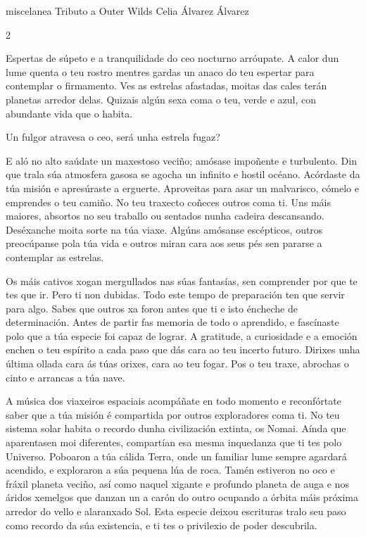 \Artigo%
{miscelanea}%
{Tributo a Outer Wilds}%
{Celia Álvarez Álvarez}%
{}%

\begin{multicols}{2}

Espertas de súpeto e a tranquilidade do ceo nocturno arróupate. A calor dun
lume quenta o teu rostro mentres gardas un anaco do teu espertar para
contemplar o firmamento. Ves as estrelas afastadas, moitas das cales terán
planetas arredor delas. Quizais algún sexa coma o teu, verde e azul, con
abundante vida que o habita.

Un fulgor atravesa o ceo, será unha estrela fugaz?

E aló no alto saúdate un maxestoso veciño; amósase impoñente e turbulento.
Din que trala súa atmosfera gasosa se agocha un infinito e hostil océano.
Acórdaste da túa misión e apresúraste a erguerte. Aproveitas para asar un
malvarisco, cómelo e emprendes o teu camiño. No teu traxecto coñeces outros
coma ti. Uns máis maiores, absortos no seu traballo ou sentados nunha cadeira
descansando. Deséxanche moita sorte na túa viaxe. Algúns amósanse escépticos,
outros preocúpanse pola túa vida e outros miran cara aos seus pés sen pararse
a contemplar as estrelas.

Os máis cativos xogan mergullados nas súas fantasías, sen comprender por que te
tes que ir. Pero ti non dubidas. Todo este tempo de preparación ten que
servir para algo. Sabes que outros xa foron antes que ti e isto éncheche de
determinación. Antes de partir fas memoria de todo o aprendido, e fascínaste
polo que a túa especie foi capaz de lograr. A gratitude, a curiosidade e a
emoción enchen o teu espírito a cada paso que dás cara ao teu incerto futuro.
Dirixes unha última ollada cara ás túas orixes, cara ao teu fogar. Pos o teu
traxe, abrochas o cinto e arrancas a túa nave.

A música dos viaxeiros espaciais acompáñate en todo momento e reconfórtate
saber que a túa misión é compartida por outros exploradores coma ti. No teu
sistema solar habita o recordo dunha civilización extinta, os Nomai. Aínda
que aparentasen moi diferentes, compartían esa mesma inquedanza que ti tes
polo Universo. Poboaron a túa cálida Terra, onde un familiar lume sempre
agardará acendido, e exploraron a súa pequena lúa de roca. Tamén estiveron no  %
oco e fráxil planeta veciño, así como naquel xigante e profundo planeta de
auga e nos áridos xemelgos que danzan un a carón do outro ocupando a órbita
máis próxima arredor do vello e alaranxado Sol. Esta especie deixou
escrituras tralo seu paso como recordo da súa existencia, e ti tes o
privilexio de poder descubrila.


\end{multicols}

